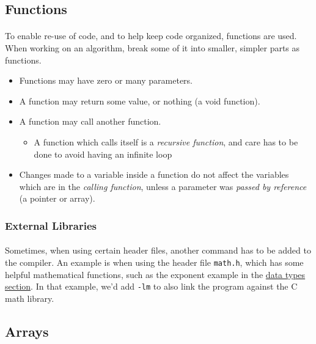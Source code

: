 \documentclass[letter,11pt]{article}
\begin{document}
\FloatBarrier
\subsection{Functions}
\paragraph{}To enable re-use of code, and to help keep code organized, functions are used. When working on an algorithm, break some of it into smaller, simpler parts as functions.
\begin{itemize}
    \item Functions may have zero or many parameters.
    \item A function may return some value, or nothing (a void function).
    \item A function may call another function.
    \begin{itemize}
        \item A function which calls itself is a \textit{recursive function}, and care has to be done to avoid having an infinite loop
    \end{itemize}
    \item Changes made to a variable inside a function do not affect the variables which are in the \textit{calling function}, unless a parameter was \textit{passed by reference} (a pointer or array).
\end{itemize}

\subsubsection{External Libraries}
\paragraph{}Sometimes, when using certain header files, another command has to be added to the compiler. An example is when using the header file \texttt{math.h}, which has some helpful mathematical functions, such as the exponent example in the \hyperref[sec:datatypes]{data types section}. In that example, we'd add \texttt{-lm} to also link the program against the C math library.

\subsection{Arrays}\label{sec:arrays}
\end{document}
